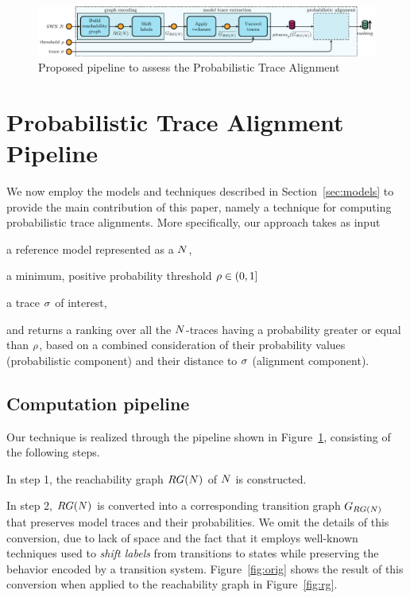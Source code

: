 \begin{figure}[!t]
	\hspace*{-1cm}\includegraphics[width=1.2\textwidth]{images/pipeline}
	\caption{Proposed pipeline to assess the Probabilistic Trace Alignment}\label{fig:pipe}
\end{figure}


\section{Probabilistic Trace Alignment Pipeline}
We now employ the models and techniques described in Section~\ref{sec:models} to provide the main contribution of this paper, namely a technique for computing probabilistic trace alignments. More specifically, our approach takes as input 
\begin{inparaenum}[\it (i)]
\item a reference model represented as a \uswn $N$,
\item a minimum, positive probability threshold $\rho \in (0,1]$
\item a trace $\sigma$ of interest,  
\end{inparaenum}
and returns a ranking over all the $N$-traces having a probability greater or equal than $\rho$, based on a combined consideration of their probability values (probabilistic component) and their distance to $\sigma$ (alignment component).

\subsection{Computation pipeline}
Our technique is realized through the pipeline shown in Figure~\ref{fig:pipe}, consisting of the following steps.

In step 1, the reachability graph $RG(N)$ of $N$ is constructed.

In step 2,  $RG(N)$ is converted into a corresponding transition graph $G_{RG(N)}$ that preserves model traces and their probabilities. We omit the details of this conversion, due to lack of space and the fact that it employs well-known techniques used to \emph{shift labels} from transitions to states while preserving the behavior encoded by a transition system. Figure~\eqref{fig:orig} shows the result of this conversion when applied to the reachability graph in Figure~\eqref{fig:rg}.


